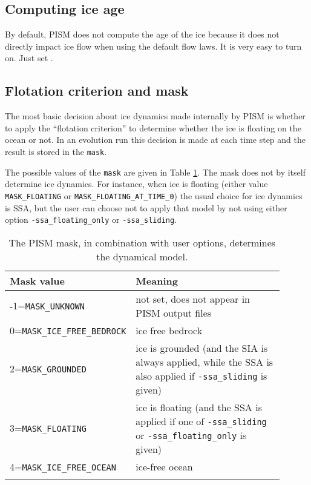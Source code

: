 \subsection{Computing ice age} \label{subsect:age}

By default, PISM does not compute the age of the ice because it does not directly impact ice flow when using the default flow laws. It is very easy to turn on.  Just set .

  
\subsection{Flotation criterion and mask} \label{subsect:floatmask}  The most basic decision about ice dynamics made internally by PISM is whether to apply the ``flotation criterion'' to determine whether the ice is floating on the ocean or not.  In an evolution run this decision is made at each time step and the result is stored in the \texttt{mask}.

The possible values of the \texttt{mask} are given in Table \ref{tab:maskvals}.  The mask does not by itself determine ice dynamics.  For instance, when ice is floating (either value \texttt{MASK_FLOATING} or \texttt{MASK_FLOATING_AT_TIME_0}) the usual choice for ice dynamics is SSA, but the user can choose not to apply that model by not using either option \texttt{-ssa_floating_only} or \texttt{-ssa_sliding}.

\begin{table}[ht]
  \centering
 \small
  \begin{tabular}{p{0.25\linewidth}p{0.65\linewidth}}
    \toprule
    \textbf{Mask value} & \textbf{Meaning}\\
    \midrule
    -1=\texttt{MASK_UNKNOWN} & not set, does not appear in PISM output files \\
    0=\texttt{MASK_ICE_FREE_BEDROCK} & ice free bedrock \\
    2=\texttt{MASK_GROUNDED}& ice is grounded (and the SIA is always applied, while the SSA is also applied if \texttt{-ssa_sliding} is given) \\
    3=\texttt{MASK_FLOATING} & ice is floating (and the SSA is applied if one of \texttt{-ssa_sliding} or \texttt{-ssa_floating_only} is given) \\
    4=\texttt{MASK_ICE_FREE_OCEAN} & ice-free ocean \\
    \\\bottomrule
  \end{tabular}
  \normalsize
  \caption{The PISM mask, in combination with user options, determines the dynamical model.}
  \label{tab:maskvals} 
\end{table}

